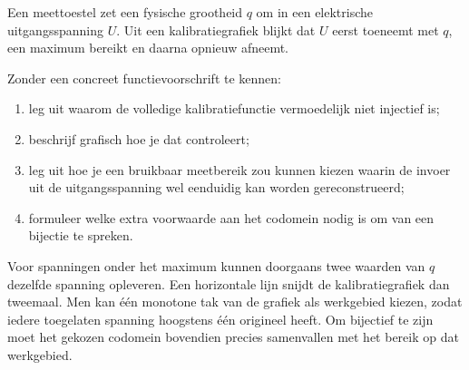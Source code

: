 \documentclass{ximera}
\begin{document}
\begin{oefening}{\oefG}

Een meettoestel zet een fysische grootheid \(q\) om in een elektrische
uitgangsspanning \(U\). Uit een kalibratiegrafiek blijkt dat \(U\) eerst
toeneemt met \(q\), een maximum bereikt en daarna opnieuw afneemt.

Zonder een concreet functievoorschrift te kennen:

\begin{enumerate}
    \item leg uit waarom de volledige kalibratiefunctie vermoedelijk niet injectief is;
    \item beschrijf grafisch hoe je dat controleert;
    \item leg uit hoe je een bruikbaar meetbereik zou kunnen kiezen waarin
          de invoer uit de uitgangsspanning wel eenduidig kan worden gereconstrueerd;
    \item formuleer welke extra voorwaarde aan het codomein nodig is om van
          een bijectie te spreken.
\end{enumerate}

\begin{oplossing}
Voor spanningen onder het maximum kunnen doorgaans twee waarden van \(q\)
dezelfde spanning opleveren. Een horizontale lijn snijdt de kalibratiegrafiek
dan tweemaal. Men kan één monotone tak van de grafiek als werkgebied kiezen,
zodat iedere toegelaten spanning hoogstens één origineel heeft. Om bijectief
te zijn moet het gekozen codomein bovendien precies samenvallen met het bereik
op dat werkgebied.
\end{oplossing}

\end{oefening}
\end{document}
